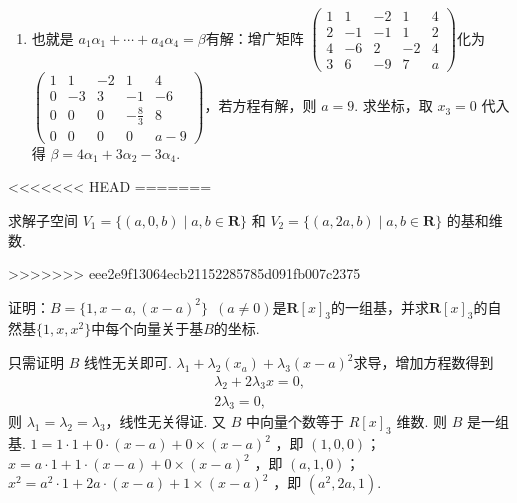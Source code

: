 \begin{exercise}
\begin{exgroup}
\begin{answer}
\begin{enumerate}
                \item 也就是 $a_1\alpha_1+\cdots+a_4\alpha_4=\beta$有解：增广矩阵 $\begin{pmatrix}
                              1 & 1  & -2 & 1  & 4 \\
                              2 & -1 & -1 & 1  & 2 \\
                              4 & -6 & 2  & -2 & 4 \\
                              3 & 6  & -9 & 7  & a\end{pmatrix}$化为 $\begin{pmatrix}
                              1 & 1  & -2 & 1         & 4   \\
                              0 & -3 & 3  & -1        & -6  \\
                              0 & 0  & 0  & -\frac 83 & 8   \\
                              0 & 0  & 0  & 0         & a-9\end{pmatrix}$，若方程有解，则 $a=9$. 求坐标，取 $x_3=0$ 代入得 $\beta=4\alpha_1+3\alpha_2-3\alpha_4$.
            \end{enumerate}
        \end{answer}
<<<<<<< HEAD
=======

        \item 求解子空间 $V_1 = \{(a,0,b) \mid a,b \in \mathbf{R}\}$ 和 $V_2 = \{(a,2a,b) \mid a,b \in \mathbf{R}\}$ 的基和维数.
        \begin{answer}

        \end{answer}
>>>>>>> eee2e9f13064ecb21152285785d091fb007c2375

        \item 证明：$B=\{1,x-a,(x-a)^2\}\enspace(a\neq 0)$是$\mathbf{R}[x]_3$的一组基，并求$\mathbf{R}[x]_3$的自然基$\{1,x,x^2\}$中每个向量关于基$B$的坐标.
        \begin{answer}
            只需证明 $B$ 线性无关即可. $\lambda_1+\lambda_2(x_a)+\lambda_3(x-a)^2$求导，增加方程数得到
            \begin{gather*}
                \lambda_2+2\lambda_3x=0, \\
                2\lambda_3=0,
            \end{gather*}
            则 $\lambda_1=\lambda_2=\lambda_3$，线性无关得证. 又 $B$ 中向量个数等于 $R[x]_3$ 维数. 则 $B$ 是一组基. $1=1 \cdot 1+0 \cdot (x-a)+0\times(x-a)^2$ ，即 $(1,0,0)$；$x=a \cdot 1+1 \cdot (x-a)+0\times(x-a)^2$ ，即 $(a,1,0)$；$x^2=a^2 \cdot 1+2a \cdot (x-a)+1\times(x-a)^2$ ，即 $(a^2,2a,1)$.
        \end{answer}


\end{exgroup}
\end{exercise}
